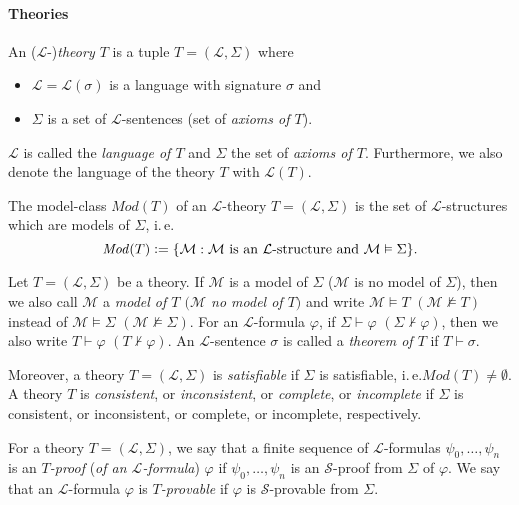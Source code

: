 \paragraph{Theories}
An ($\mathcal{L}$-)\textit{theory $T$} is a tuple $T = (\mathcal{L}, \Sigma)$ where 
\begin{itemize}
\item $\mathcal{L} = \mathcal{L}(\sigma)$ is a language with signature $\sigma$ and
\item $\Sigma$ is a set of $\mathcal{L}$-sentences (set of \textit{axioms of $T$}).
\end{itemize}

$\mathcal{L}$ is called the \textit{language of $T$} and $\Sigma$ the set of \textit{axioms of $T$}.
Furthermore, we also denote the language of the theory $T$ with $\mathcal{L}(T)$.  

The model-class $\mathit{Mod}(T)$ of an $\mathcal{L}$-theory $T = (\mathcal{L}, \Sigma)$ is the set of $\mathcal{L}$-structures which are models of $\Sigma$, i.\,e.\@
\[ \mathit{Mod}(T) \vcentcolon= \lbrace \mathcal{M} : \mathcal{M} \text{ is an }\mathcal{L} \text{-structure and }\mathcal{M} \vDash \Sigma \rbrace. \]

Let $T = (\mathcal{L},\Sigma)$ be a theory. If $\mathcal{M}$ is a model of $\Sigma$ ($\mathcal{M}$ is no model of $\Sigma$), then we also call $\mathcal{M}$ a \textit{model of $T$ $(\mathcal{M}$ no model of $T)$} and write $\mathcal{M}\vDash T$ $(\mathcal{M} \nvDash T)$ instead of $\mathcal{M}\vDash \Sigma$ $(\mathcal{M}\nvDash \Sigma)$. For an $\mathcal{L}$-formula $\varphi$, if $\Sigma \vdash \varphi$ $(\Sigma \nvdash \varphi)$, then we also write $T \vdash \varphi$ $(T \nvdash \varphi)$. An $\mathcal{L}$-sentence $\sigma$ is called a \textit{theorem of $T$} if $T \vdash \sigma$.

Moreover, a theory $T=(\mathcal{L}, \Sigma)$ is \textit{satisfiable} if $\Sigma$ is satisfiable, i.\,e.\@ $\mathit{Mod}(T) \neq \emptyset$. A theory $T$ is \textit{consistent}, or \textit{inconsistent}, or \textit{complete}, or \textit{incomplete} if $\Sigma$ is consistent, or inconsistent, or complete, or incomplete, respectively.

For a theory $T=(\mathcal{L}, \Sigma)$, we say that a finite sequence of $\mathcal{L}$-formulas $\psi_0, \ldots, \psi_n$ is an \textit{$T$-proof} (\textit{of an $\mathcal{L}$-formula}) $\varphi$ if $\psi_0, \ldots, \psi_n$ is an $\mathcal{S}$-proof from $\Sigma$ of $\varphi$. We say that an $\mathcal{L}$-formula $\varphi$ is \textit{$T$-provable} if $\varphi$ is $\mathcal{S}$-provable from $\Sigma$.

